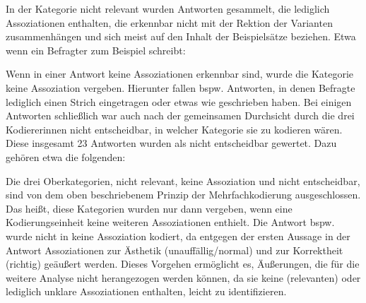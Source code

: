 In der Kategorie \glqq nicht relevant\grqq{} wurden Antworten gesammelt, die lediglich Assoziationen enthalten, die erkennbar nicht mit der Rektion der Varianten zusammenhängen und sich meist auf den Inhalt der Beispielsätze beziehen. 
Etwa wenn ein Befragter zum Beispiel  schreibt: 
\begin{exe}
\ex {}
\end{exe}
Wenn in einer Antwort keine Assoziationen erkennbar sind, wurde die Kategorie \glqq keine Assoziation\grqq{} vergeben. 
Hierunter fallen bspw. Antworten, in denen Befragte lediglich einen Strich eingetragen oder etwas wie  geschrieben haben. 
Bei einigen Antworten schließlich war auch nach der gemeinsamen Durchsicht durch die drei Kodiererinnen nicht entscheidbar, in welcher Kategorie sie zu kodieren wären. 
Diese insgesamt 23 Antworten wurden als \glqq nicht entscheidbar\grqq{} gewertet. 
Dazu gehören etwa die folgenden:
\begin{exe}
\ex {}
\ex {}
\end{exe} 
Die drei Oberkategorien, \glqq nicht relevant\grqq, \glqq keine Assoziation\grqq{} und \glqq nicht entscheidbar\grqq, sind von dem oben beschriebenem Prinzip der Mehrfachkodierung ausgeschlossen. 
Das heißt, diese Kategorien wurden nur dann vergeben, wenn eine Kodierungseinheit keine weiteren Assoziationen enthielt.
Die Antwort  bspw. wurde nicht in \glqq keine Assoziation\grqq{} kodiert, da entgegen der ersten Aussage in der Antwort Assoziationen zur Ästhetik (\glqq unauffällig/normal\grqq) und zur Korrektheit (\glqq richtig\grqq) geäußert werden.  
Dieses Vorgehen ermöglicht es, Äußerungen, die für die weitere Analyse nicht herangezogen werden können, da sie keine (relevanten) oder lediglich unklare Assoziationen enthalten, leicht zu identifizieren. 

